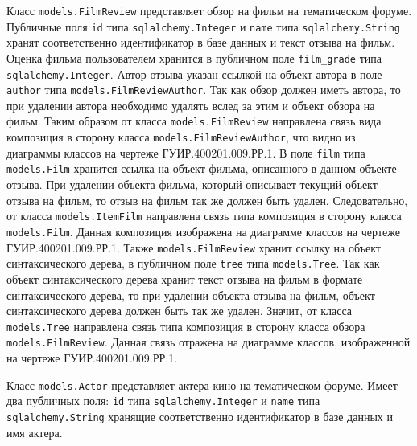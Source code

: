 Класс \texttt{mo\-dels.FilmReview} представляет обзор на фильм на тематическом форуме. Публичные поля \texttt{id} типа \texttt{sqlalchemy.Integer} и \texttt{name} типа \texttt{sql\-alchemy.String} хранят соответственно идентификатор в базе данных и текст отзыва на фильм. Оценка фильма пользователем хранится в публичном поле \texttt{film\_grade} типа \texttt{sqlalchemy.Integer}. Автор отзыва указан ссылкой на объект автора в поле \texttt{author} типа \texttt{mo\-dels.FilmRevi\-ewAuthor}. Так как обзор должен иметь автора, то при удалении автора необходимо удалять вслед за этим и объект обзора на фильм. Таким образом от класса \texttt{mo\-dels.Fi\-lmReview} направлена связь вида композиция в сторону класса \texttt{mo\-dels.Film\-ReviewAuthor}, что видно из диаграммы классов на чертеже ГУИР.400201.0\-09.РР.1. В поле \texttt{film} типа \texttt{mo\-dels.Film} хранится ссылка на объект фильма, описанного в данном объекте отзыва. При удалении объекта фильма, который описывает текущий объект отзыва на фильм, то отзыв на фильм так же должен быть удален. Следовательно, от класса \texttt{mo\-dels.ItemFilm} направлена связь типа композиция в сторону класса \texttt{mo\-dels.Film}. Данная композиция изображена на диаграмме классов на чертеже ГУИР.400201.009.РР.1. Также \texttt{mo\-dels.FilmReview} хранит ссылку на объект синтаксического дерева, в публичном поле \texttt{tree} типа \texttt{mo\-dels.Tree}. Так как объект синтаксического дерева хранит текст отзыва на фильм в формате синтаксического дерева, то при удалении объекта отзыва на фильм, объект синтаксического дерева должен быть так же удален. Значит, от класса \texttt{mo\-dels.Tree} направлена связь типа композиция в сторону класса обзора \texttt{mo\-dels.FilmReview}. Данная связь отражена на диаграмме классов, изображенной на чертеже ГУИР.400201.009.РР.1.

Класс \texttt{mo\-dels.Actor} представляет актера кино на тематическом форуме. Имеет два публичных поля: \texttt{id} типа \texttt{sqlalchemy.Integer} и \texttt{name} типа \texttt{sqlalchemy.String} хранящие соответственно идентификатор в базе данных и имя актера.

